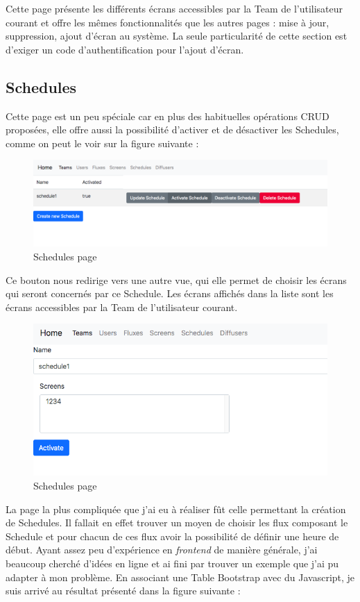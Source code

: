 \documentclass[french]{article}
\begin{document}
Cette page présente les différents écrans accessibles par la Team de l'utilisateur courant et offre les mêmes fonctionnalités que les autres pages : mise à jour, suppression, ajout d'écran au système. La seule particularité de cette section est d'exiger un code d'authentification pour l'ajout d'écran.

\subsection{Schedules}

Cette page est un peu spéciale car en plus des habituelles opérations CRUD proposées, elle offre aussi la possibilité d'activer et de désactiver les Schedules, comme on peut le voir sur la figure suivante :

\begin{figure}[h]
	\centering	
	\includegraphics[width=0.8\linewidth]{interface/schedulepage.png}%
	\caption{Schedules page}
\end{figure} 

Ce bouton nous redirige vers une autre vue, qui elle permet de choisir les écrans qui seront concernés par ce Schedule. Les écrans affichés dans la liste sont les écrans accessibles par la Team de l'utilisateur courant.

\begin{figure}[h]
	\centering	
	\includegraphics[width=0.8\linewidth]{interface/schedulepage_activation.png}%
	\caption{Schedules page}
\end{figure} 
\newpage
La page la plus compliquée que j'ai eu à réaliser fût celle permettant la création de Schedules. Il fallait en effet trouver un moyen de choisir les flux composant le Schedule et pour chacun de ces flux avoir la possibilité de définir une heure de début. Ayant assez peu d'expérience en \textit{frontend} de manière générale, j'ai beaucoup cherché d'idées en ligne et ai fini par trouver un exemple que j'ai pu adapter à mon problème. En associant une Table Bootstrap avec du Javascript, je suis arrivé au résultat présenté dans la figure suivante :
\end{document}
